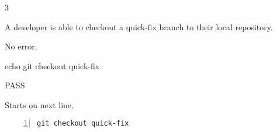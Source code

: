 \begin{description}[align=right,leftmargin=3.2cm,labelindent=3.0cm]
\item[Step:] 3
\item[Confirm:] A developer is able to checkout a quick-fix branch to their local repository.
\item[Expectation:] No error.
\item[Command:] echo git  checkout quick-fix
\item[Test Result:] PASS
\item[Evidence:] Starts on next line.
\end{description}
\begin{lstlisting}[numbers=left]
git checkout quick-fix

\end{lstlisting}
